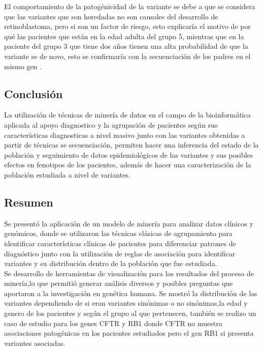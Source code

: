 El comportamiento de la patogénicidad de la variante se debe a que se considera que las variantes que son heredadas no son causales del desarrollo de retinoblastoma, pero si son un factor de riesgo, esto explicaría el motivo de por qué  las pacientes que están en la edad adulta del grupo 5, mientras que en la paciente del grupo 3 que tiene dos años tienen una alta probabilidad de que la variante se de novo, esto se confirmaría con la secuenciación de los padres en el mismo gen \cite{Parma2017}. \\

\subsection{Conclusión}

La utilización de técnicas de minería de datos en el campo de la bioinformática aplicada al apoyo diagnostico y  la agrupación de pacientes según sus características diagnosticas a nivel masivo junto con las variantes obtenidas a partir de técnicas se secuenciación, permiten hacer una inferencia del estado de la población y seguimiento de datos epidemiológicos de las variantes y sus posibles efectos en fenotipos de los pacientes, además de hacer una caracterización de la población estudiada a nivel de variantes.


\subsection*{Resumen}

Se presentó la aplicación de un modelo de minería para analizar datos clínicos y genómicos, donde se utilizaron las técnicas clásicas de  agrupamiento para identificar características clínicas de pacientes para diferenciar patrones de diagnóstico junto con la utilización de reglas de asociación para identificar variantes y su distribución dentro de la población que fue estudiada.\\

Se desarrollo de herramientas de visualización para los resultados del proceso de minería,lo que permitió generar análisis diversos y posibles preguntas que aportaron a la investigación en genética humana. Se mostró la distribución de las variantes dependiendo de si eran variantes sinónimas o no sinónimas,la edad y genero de los pacientes y según el grupo al que pertenecen, también se realizo un caso de estudio para los genes CFTR y RB1 donde CFTR no muestra asociaciones patogénicas en los pacientes estudiados pero el gen RB1 si presenta variantes asociadas.




   
